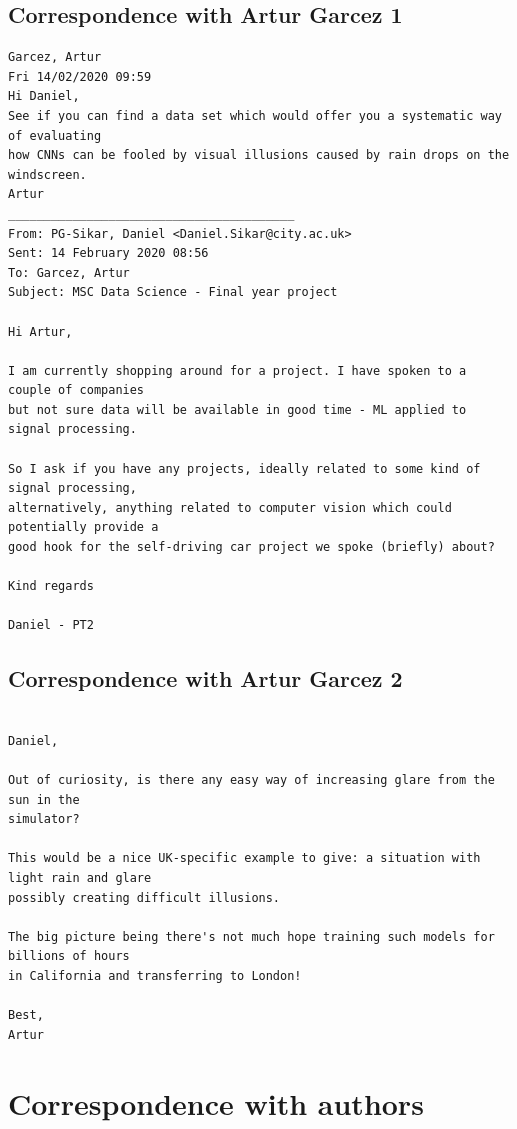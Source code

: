 \subsection{Correspondence with Artur Garcez 1}
\begin{verbatim}
Garcez, Artur
Fri 14/02/2020 09:59
Hi Daniel,
See if you can find a data set which would offer you a systematic way of evaluating
how CNNs can be fooled by visual illusions caused by rain drops on the windscreen.
Artur
________________________________________
From: PG-Sikar, Daniel <Daniel.Sikar@city.ac.uk>
Sent: 14 February 2020 08:56
To: Garcez, Artur
Subject: MSC Data Science - Final year project

Hi Artur,

I am currently shopping around for a project. I have spoken to a couple of companies
but not sure data will be available in good time - ML applied to signal processing.

So I ask if you have any projects, ideally related to some kind of signal processing,
alternatively, anything related to computer vision which could potentially provide a
good hook for the self-driving car project we spoke (briefly) about?

Kind regards

Daniel - PT2    
\end{verbatim}

\subsection{Correspondence with Artur Garcez 2}
\label{met:corr_arthur_2}
\begin{verbatim}

Daniel,

Out of curiosity, is there any easy way of increasing glare from the sun in the 
simulator?

This would be a nice UK-specific example to give: a situation with light rain and glare 
possibly creating difficult illusions.

The big picture being there's not much hope training such models for billions of hours 
in California and transferring to London!

Best,
Artur    
\end{verbatim}

\section{Correspondence with authors}
\label{corr_with_authors}

